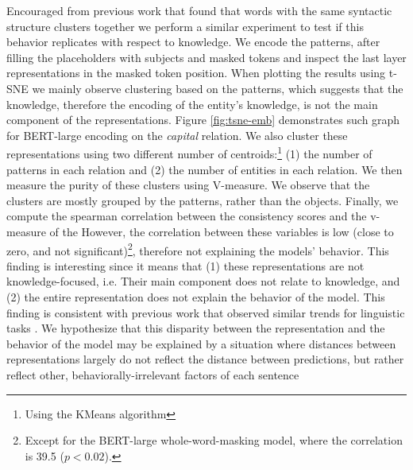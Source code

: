 Encouraged from previous work that found that words with the same syntactic structure clusters together \cite{chi-etal-2020-finding,ravfogel-etal-2020-unsupervised} we perform a similar experiment to test if this behavior replicates with respect to knowledge.
We encode the patterns, after filling the placeholders with subjects and masked tokens and inspect the last layer representations in the masked token position.
When plotting the results using t-SNE \cite{tsne} we mainly observe clustering based on the patterns, which suggests that the knowledge, therefore the encoding of the entity's knowledge, is not the main component of the representations.
Figure \ref{fig:tsne-emb} demonstrates such graph for BERT-large encoding on the \textit{capital} relation.
We also cluster these representations using two different number of centroids:\footnote {Using the KMeans algorithm} (1) the number of patterns in each relation and (2) the number of entities in each relation. We then measure the purity of these clusters using V-measure. We observe that the clusters are mostly grouped by the patterns, rather than the objects.
Finally, we compute the spearman correlation between the consistency scores and the v-measure of the 
However, the correlation between these variables is low (close to zero, and not significant)\footnote{Except for the BERT-large whole-word-masking model, where the correlation is 39.5 ($p<0.02$).}, therefore not explaining the models' behavior.
This finding is interesting since it means that (1) these representations are not knowledge-focused, i.e. Their main component does not relate to knowledge, and (2) the entire representation does not explain the behavior of the model. This finding is consistent with previous work that observed similar trends for linguistic tasks \cite{amnesic_probing}.
We hypothesize that this disparity between the representation and the behavior of the model may be explained by a situation where distances between representations largely do not reflect the distance between predictions, but rather reflect other, behaviorally-irrelevant factors of each sentence


